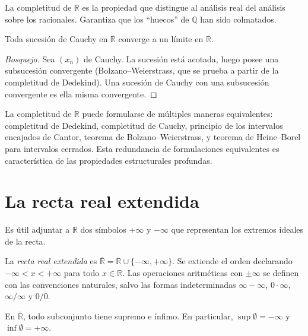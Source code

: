 La completitud de $\mathbb{R}$ es la propiedad que distingue al análisis real del análisis sobre los racionales. Garantiza que los ``huecos'' de $\mathbb{Q}$ han sido colmatados.

\begin{theorem}
\label{teo:completitud-r}
Toda sucesión de Cauchy en $\mathbb{R}$ converge a un límite en $\mathbb{R}$.
\end{theorem}

\begin{proof}[Bosquejo]
Sea $(x_n)$ de Cauchy. La sucesión está acotada, luego posee una subsucesión convergente (Bolzano--Weierstrass, que se prueba a partir de la completitud de Dedekind). Una sucesión de Cauchy con una subsucesión convergente es ella misma convergente.
\end{proof}

\begin{remark}
La completitud de $\mathbb{R}$ puede formularse de múltiples maneras equivalentes: completitud de Dedekind, completitud de Cauchy, principio de los intervalos encajados de Cantor, teorema de Bolzano--Weierstrass, y teorema de Heine--Borel para intervalos cerrados. Esta redundancia de formulaciones equivalentes es característica de las propiedades estructurales profundas.
\end{remark}

\section{La recta real extendida}

Es útil adjuntar a $\mathbb{R}$ dos símbolos $+\infty$ y $-\infty$ que representan los extremos ideales de la recta.

\begin{definition}
La \emph{recta real extendida} es $\overline{\mathbb{R}}=\mathbb{R}\cup\{-\infty,+\infty\}$. Se extiende el orden declarando $-\infty<x<+\infty$ para todo $x\in\mathbb{R}$. Las operaciones aritméticas con $\pm\infty$ se definen con las convenciones naturales, salvo las formas indeterminadas $\infty-\infty$, $0\cdot\infty$, $\infty/\infty$ y $0/0$.
\end{definition}

\begin{example}
En $\overline{\mathbb{R}}$, todo subconjunto tiene supremo e ínfimo. En particular, $\sup\emptyset=-\infty$ y $\inf\emptyset=+\infty$.
\end{example}

